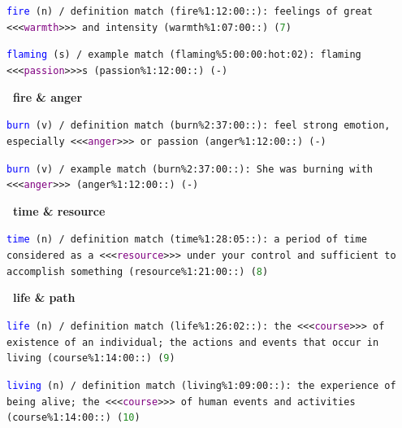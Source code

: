\documentclass[12pt,a4paper]{article}
\begin{document}
{%

\texttt{\textcolor{blue}{fire} (n) / definition match (fire\%1:12:00::): feelings of great <<<\textcolor{purple}{warmth}>>> and intensity (warmth\%1:07:00::) (\textcolor{ForestGreen}{7}) }

\texttt{\textcolor{blue}{flaming} (s) / example match (flaming\%5:00:00:hot:02): flaming <<<\textcolor{purple}{passion}>>>s (passion\%1:12:00::) (-)}

\vspace{1em}

\noindent\textbf{\textbullet\ fire \& anger}

\texttt{\textcolor{blue}{burn} (v) / definition match (burn\%2:37:00::): feel strong emotion, especially <<<\textcolor{purple}{anger}>>> or passion (anger\%1:12:00::) (-)}

\texttt{\textcolor{blue}{burn} (v) / example match (burn\%2:37:00::): She was burning with <<<\textcolor{purple}{anger}>>> (anger\%1:12:00::) (-)}

\vspace{1em}

\noindent\textbf{\textbullet\ time \& resource}

\texttt{\textcolor{blue}{time} (n) / definition match (time\%1:28:05::): a period of time considered as a <<<\textcolor{purple}{resource}>>> under your control and sufficient to accomplish something (resource\%1:21:00::) (\textcolor{ForestGreen}{8})}

\vspace{1em}

\noindent\textbf{\textbullet\ life \& path}


\texttt{\textcolor{blue}{life} (n) / definition match (life\%1:26:02::): the <<<\textcolor{purple}{course}>>> of existence of an individual; the actions and events that occur in living (course\%1:14:00::) (\textcolor{ForestGreen}{9}) }

\texttt{\textcolor{blue}{living} (n) / definition match (living\%1:09:00::): the experience of being alive; the <<<\textcolor{purple}{course}>>> of human events and activities (course\%1:14:00::) (\textcolor{ForestGreen}{10}) }

}
\end{document}
